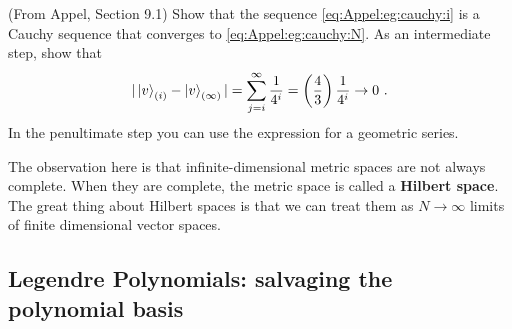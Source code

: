 \begin{exercise}
(From Appel, Section 9.1) Show that the sequence \eqref{eq:Appel:eg:cauchy:i} is a Cauchy sequence that converges to \eqref{eq:Appel:eg:cauchy:N}. As an intermediate step, show that
\begin{align}
    |\left|v\right\rangle_{(i)}-\left|v\right\rangle_{(\infty)}| = \sum_{j=i}^\infty \frac{1}{4^i}
    = \left(\frac{4}{3}\right)\frac{1}{4^i} \to 0 \ .
\end{align}
In the penultimate step you can use the expression for a geometric series.
\end{exercise}

The observation here is that infinite-dimensional metric spaces are not always complete. When they are complete, the metric space is called a \textbf{Hilbert space}. The great thing about Hilbert spaces is that we can treat them as $N\to\infty$ limits of finite dimensional vector spaces. 










\subsection{Legendre Polynomials: salvaging the polynomial basis}


